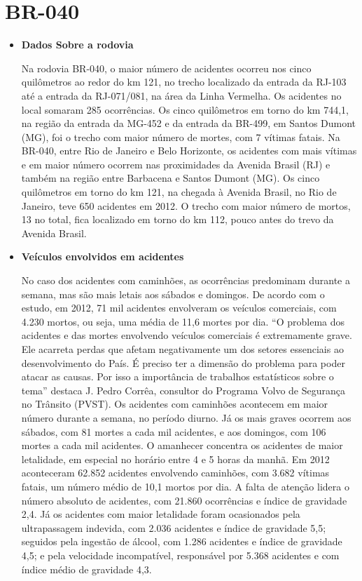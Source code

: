 \chapter{BR-040}

\begin{itemize}
   \item \textbf{Dados Sobre a rodovia}

   Na rodovia BR-040, o maior número de acidentes ocorreu nos cinco quilômetros ao redor do km 121, no trecho localizado da entrada da RJ-103 até a entrada da RJ-071/081, \cite{pvst} na área da Linha Vermelha. Os acidentes no local somaram 285 ocorrências. Os cinco quilômetros em torno do km 744,1, na região da entrada da MG-452 e da entrada da BR-499, em Santos Dumont (MG), foi o trecho com maior número de mortes, com 7 vítimas fatais.
   Na BR-040, entre Rio de Janeiro e Belo Horizonte, os acidentes com mais vítimas e em maior número ocorrem nas proximidades da Avenida Brasil (RJ) e também na região entre Barbacena e Santos Dumont (MG). Os cinco quilômetros em torno do km 121, na chegada à Avenida Brasil, no Rio de Janeiro, teve 650 acidentes em 2012. O trecho com maior número de mortos, 13 no total, fica localizado em torno do km 112, pouco antes do trevo da Avenida Brasil.

   \item \textbf{Veículos envolvidos em acidentes}

   No caso dos acidentes com caminhões, as ocorrências predominam durante a semana, mas são mais letais aos sábados e domingos. De acordo com o estudo, em 2012, 71 mil acidentes envolveram os veículos comerciais, com 4.230 mortos, ou seja, uma média de 11,6 mortes por dia. “O problema dos acidentes e das mortes envolvendo veículos comerciais é extremamente grave. Ele acarreta perdas que afetam negativamente um dos setores essenciais ao desenvolvimento do País. É preciso ter a dimensão do problema para poder atacar as causas. Por isso a importância de trabalhos estatísticos sobre o tema” destaca J. Pedro Corrêa, consultor do Programa Volvo de Segurança no Trânsito (PVST).
   Os acidentes com caminhões acontecem em maior número durante a semana, no período diurno. Já os mais graves ocorrem aos sábados, com 81 mortes a cada mil acidentes, e aos domingos, com 106 mortes a cada mil acidentes. O amanhecer concentra os acidentes de maior letalidade, em especial no horário entre 4 e 5 horas da manhã.
   Em 2012 aconteceram 62.852 acidentes envolvendo caminhões, com 3.682 vítimas fatais, um número médio de 10,1 mortos por dia. \cite{gpt}
   A falta de atenção lidera o número absoluto de acidentes, com 21.860 ocorrências e índice de gravidade 2,4. Já os acidentes com maior letalidade foram ocasionados pela ultrapassagem indevida, com 2.036 acidentes e índice de gravidade 5,5; seguidos pela ingestão de álcool, com 1.286 acidentes e índice de gravidade 4,5; e pela velocidade incompatível, responsável por 5.368 acidentes e com índice médio de gravidade 4,3.


\end{itemize}
